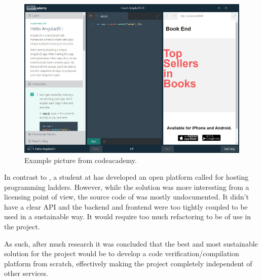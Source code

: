 \begin{figure}[h]
   \centering
    \includegraphics[width=.75\linewidth]{img/codeacademy_code.jpg}
    \caption{Example picture from codeacademy.}
\end{figure}


In contrast to \techio{}, a student at \LTU{} has developed an open platform called \sockr{} for hosting programming ladders. However, while the solution was more interesting from a licensing point of view, the source code of \sockr{} was mostly undocumented. It didn't have a clear API and the backend and frontend were too tightly coupled to be used in a sustainable way. It would require too much refactoring to be of use in the project.

As such, after much research it was concluded that the best and most sustainable solution for the project would be to develop a code verification/compilation platform from scratch, effectively making the project completely independent of other services.
